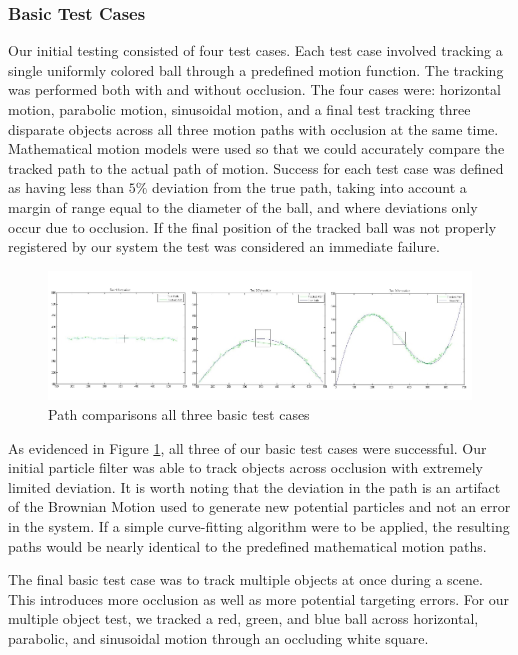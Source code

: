 \documentclass[11pt]{article}
\begin{document}
\subsubsection{Basic Test Cases}
Our initial testing consisted of four test cases.  Each test case involved tracking a single uniformly colored ball through a predefined motion function.  The tracking was performed both with and without occlusion.  The four cases were: horizontal motion, parabolic motion, sinusoidal motion, and a final test tracking three disparate objects across all three motion paths with occlusion at the same time.  Mathematical motion models were used so that we could accurately compare the tracked path to the actual path of motion.  Success for each test case was defined as having less than $5\%$ deviation from the true path, taking into account a margin of range equal to the diameter of the ball, and where deviations only occur due to occlusion.  If the final position of the tracked ball was not properly registered by our system the test was considered an immediate failure.  



\begin{figure}[H]
\centering
\includegraphics[scale=.45]{img/CombinedPath.jpg}
\caption{Path comparisons all three basic test cases}
\label{fig:PathComparisons}
\end{figure}


As evidenced in Figure \ref{fig:PathComparisons}, all three of our basic test cases were successful.  Our initial particle filter was able to track objects across occlusion with extremely limited deviation.  It is worth noting that the deviation in the path is an artifact of the Brownian Motion used to generate new potential particles and not an error in the system.  If a simple curve-fitting algorithm were to be applied, the resulting paths would be nearly identical to the predefined mathematical motion paths.  

The final basic test case was to track multiple objects at once during a scene.  This introduces more occlusion as well as more potential targeting errors.  For our multiple object test, we tracked a red, green, and blue ball across horizontal, parabolic, and sinusoidal motion through an occluding white square.  
\end{document}
